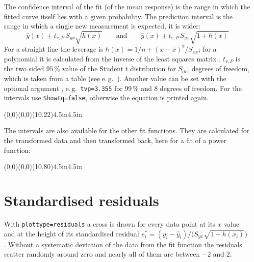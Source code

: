 \documentclass[11pt,english,BCOR10mm,DIV12,bibliography=totoc,parskip=false,
   smallheadings, headexclude,footexclude,oneside]{pst-doc}
\let\Section\section
\def\section{\clearpage\Section}
\begin{document}
\medskip
The confidence interval of the fit (of the mean response) is the range in
which the fitted curve itself lies with a given probability. The prediction
interval is the range in which a single new measurement is expected, it is wider:
\[
\hat y(x) \pm t_{v,P}\,S_{yx}\sqrt{h(x)}
\qquad\text{and}\qquad
\hat y(x) \pm t_{v,P}\,S_{yx}\sqrt{1+h(x)}
\]
For a straight line the leverage is $h(x)=1/n+(x-\bar x)^2/S_{xx}$; for a
polynomial it is calculated from the inverse of the least squares matrix
\cite{draper98}.
$t_{v,P}$ is the two sided 95\,\% value of the Student $t$ distribution for
$S_{\mathrm{dof}}$ degrees of freedom, which is taken from a table
(see e.\,g.\ \cite{devore99}). Another
value can be set with the optional argument , e.\,g.\ \texttt{tvp=3.355}
for 99\,\% and 8 degrees of freedom. For the intervals use \texttt{ShowEq=false},
otherwise the equation is printed again.

\begin{LTXexample}[pos=t]
\begin{psgraph}[arrows=->,Dy=2](0,0)(0,0)(10,22){4.5in}{4.5in}
\listplot[ShowEq,decimals=2,EqPos=1 20]{\Calib}
\listplot[plottype=bothci,linestyle=dashed,linecolor=blue]{\Calib}
\listplot[plottype=bothpi,linestyle=dotted,linecolor=red]{\Calib}
\listplot[plotstyle=dots]{\Calib}
\end{psgraph}
\end{LTXexample}

The intervals are also available for the other fit functions. They are
calculated for the transformed data and then transformed back, here for
a fit of a power function:

\begin{LTXexample}[pos=t]
\begin{psgraph}[arrows=->,Dy=10](0,0)(0,0)(10,80){4.5in}{4.5in}
\listplot[ShowEq,decimals=2,EqPos=1 70]{\PScatter}
\listplot[plottype=bothci,linestyle=dashed,linecolor=blue]{\PScatter}
\listplot[plottype=bothpi,linestyle=dotted,linecolor=red]{\PScatter}
\listplot[plotstyle=dots]{\PScatter}
\end{psgraph}
\end{LTXexample}

\section{Standardised residuals}
With \texttt{plottype=residuals} a cross is drawn for every data point at its
$x$ value and at the height of its standardised residual
$e_i^*=(y_i-\hat y_i)/\bigl(S_{yx}\sqrt{1-h(x_i)}\bigr)$ \cite{draper98}.
Without a systematic deviation of the data from the fit function the
residuals scatter randomly around zero and nearly all of them are between $-2$ and $2$.
\end{document}
